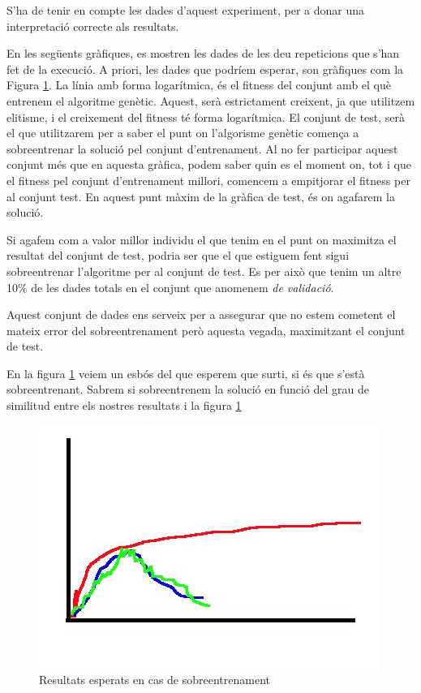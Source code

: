 S'ha de tenir en compte les dades d'aquest experiment, per a donar una
interpretació correcte als resultats.

En les següents gràfiques, es mostren les dades de les deu repeticions que s'han
fet de la execució.  A priori, les dades que podríem esperar, son gràfiques com
la Figura \ref{fig:sobreent}.  La línia amb forma logarítmica, és
el fitness del conjunt amb el què entrenem el algoritme genètic.  Aquest, serà
estrictament creixent, ja que utilitzem elitisme, i el creixement del fitness té
forma logarítmica.  El conjunt de test, serà el que utilitzarem per a saber el
punt on l'algorisme genètic comença a sobreentrenar la solució pel conjunt
d'entrenament.  Al no fer participar aquest conjunt més que en aquesta gràfica, podem
saber quin es el moment on, tot i que el fitness pel conjunt d'entrenament millori,
comencem a empitjorar el fitness per al conjunt test.  En aquest punt màxim de
la gràfica de test, és on agafarem la solució.

Si agafem com a valor millor individu el que tenim en el punt on maximitza el
resultat del conjunt de test, podria ser que el que estiguem fent sigui
sobreentrenar l'algoritme per al conjunt de test.  Es per això que tenim un
altre 10\% de les dades totals en el conjunt que anomenem \emph{de validació}. 

Aquest conjunt de dades ens serveix per a assegurar que no estem cometent el
mateix error del sobreentrenament però aquesta vegada, maximitzant el conjunt de
test.  

En la figura \ref{fig:sobreent} veiem un esbós del que esperem que surti, si és que s'està
sobreentrenant. Sabrem si sobreentrenem la solució en funció del grau de similitud entre els nostres
resultats i la figura \ref{fig:sobreent}

\begin{figure}[h]
	\begin{center}
		\includegraphics{pholus/sobreentrenament.jpg}
	\end{center}
	\caption{Resultats esperats en cas de sobreentrenament}
	\label{fig:sobreent}
\end{figure}

